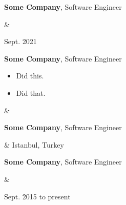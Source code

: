 \documentclass[10pt, letterpaper]{article}
\newenvironment{highlights}{
        \begin{itemize}[
                topsep=0pt,
                parsep=0.10 cm,
                partopsep=0pt,
                itemsep=0pt,
                after=\relax,
                leftmargin=0.4 cm + 3pt
            ]
    }{
        \end{itemize}
    } %
\let\originalTabularx\tabularx
\let\originalEndTabularx\endtabularx
\renewenvironment{tabularx}{\bgroup\centering\originalTabularx}{\originalEndTabularx\par\egroup}
\begin{document}
        \vspace{0.2 cm}
        \begin{tabularx}{
            \textwidth-0.4 cm-0.13cm
        }{
            K{0.2 cm}
            R{4.1 cm}
        }
            \textbf{Some Company}, Software Engineer

            \vspace{0.10 cm}

            &
            

            Sept. 2021
        \end{tabularx}

        \vspace{0.2 cm}
        \begin{tabularx}{
            \textwidth-0.4 cm-0.13cm
        }{
            K{0.2 cm}
            R{4.1 cm}
        }
            \textbf{Some Company}, Software Engineer

            \vspace{0.10 cm}

            \begin{highlights}
                \item Did this.
                \item Did that.
            \end{highlights}
            &
            

            
        \end{tabularx}

        \vspace{0.2 cm}
        \begin{tabularx}{
            \textwidth-0.4 cm-0.13cm
        }{
            K{0.2 cm}
            R{4.1 cm}
        }
            \textbf{Some Company}, Software Engineer

            \vspace{0.10 cm}

            &
            Istanbul, Turkey

            
        \end{tabularx}

        \vspace{0.2 cm}
        \begin{tabularx}{
            \textwidth-0.4 cm-0.13cm
        }{
            K{0.2 cm}
            R{4.1 cm}
        }
            \textbf{Some Company}, Software Engineer

            \vspace{0.10 cm}

            &
            

            Sept. 2015 to present
        \end{tabularx}
\end{document}
